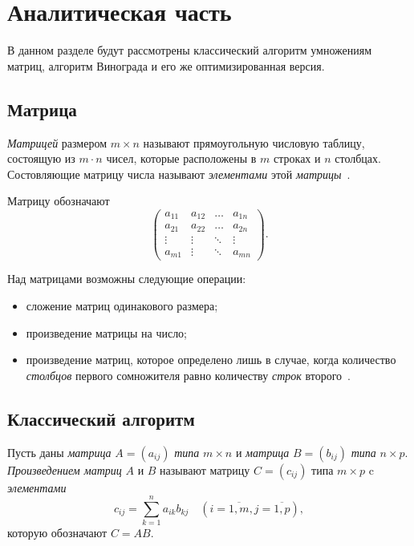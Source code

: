\chapter{Аналитическая часть}
В данном разделе будут рассмотрены классический алгоритм умножениям матриц, алгоритм Винограда и его же оптимизированная версия.

\section{Матрица}
\textit{Матрицей} размером $m \times n$ называют прямоугольную числовую таблицу, состоящую из $m \cdot n$ чисел, которые расположены в $m$ строках и $n$ столбцах.
Состовляющие матрицу числа называют \textit{элементами} этой \textit{матрицы}~\cite{matrix}.

Матрицу обозначают
\begin{equation}
    \begin{pmatrix}
        a_{11} & a_{12} & \ldots & a_{1n}\\
		a_{21} & a_{22} & \ldots & a_{2n}\\
		\vdots & \vdots & \ddots & \vdots\\
        a_{m1} & \vdots & \ddots & a_{mn}
        \end{pmatrix}.
\end{equation}

Над матрицами возможны следующие операции:
\begin{itemize}
    \item сложение матриц одинакового размера;
    \item произведение матрицы на число;
    \item произведение матриц, которое определено лишь в случае, когда количество \textit{столбцов} первого сомножителя равно количеству \textit{строк} второго~\cite{matrix}.
\end{itemize}

\section{Классический алгоритм}
Пусть даны \textit{матрица} $A = (a_{ij})$ \textit{типа} $m \times n$ и \textit{матрица} $B = (b_{ij})$ \textit{типа} $n \times p$.
\textit{Произведением матриц} $A$ и $B$ называют матрицу $C = (c_{ij})$ типа $m \times p$ c \textit{элементами}
\begin{equation}
    \label{eq:classic_1}
    c_{ij} = \sum_{k=1}^{n}a_{ik}b_{kj} \quad (i = \overline{1, m}, j = \overline{1, p}),
\end{equation}
которую обозначают $C = AB$.

